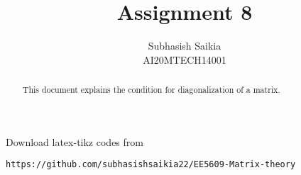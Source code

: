 \documentclass[journal,12pt]{IEEEtran}
\begin{document}
\onecolumn

\newtheorem{theorem}{Theorem}[section]
\newtheorem{problem}{Problem}
\newtheorem{proposition}{Proposition}[section]
\newtheorem{lemma}{Lemma}[section]
\newtheorem{corollary}[theorem]{Corollary}
\newtheorem{example}{Example}[section]
\newtheorem{definition}[problem]{Definition}

\newcommand{\BEQA}{\begin{eqnarray}}
\newcommand{\EEQA}{\end{eqnarray}}
\newcommand{\define}{\stackrel{\triangle}{=}}

\raggedbottom
\setlength{\parindent}{0pt}
\providecommand{\mbf}{\mathbf}
\providecommand{\pr}[1]{\ensuremath{\Pr\left(#1\right)}}
\providecommand{\qfunc}[1]{\ensuremath{Q\left(#1\right)}}
\providecommand{\sbrak}[1]{\ensuremath{{}\left[#1\right]}}
\providecommand{\lsbrak}[1]{\ensuremath{{}\left[#1\right.}}
\providecommand{\rsbrak}[1]{\ensuremath{{}\left.#1\right]}}
\providecommand{\brak}[1]{\ensuremath{\left(#1\right)}}
\providecommand{\lbrak}[1]{\ensuremath{\left(#1\right.}}
\providecommand{\rbrak}[1]{\ensuremath{\left.#1\right)}}
\providecommand{\cbrak}[1]{\ensuremath{\left\{#1\right\}}}
\providecommand{\lcbrak}[1]{\ensuremath{\left\{#1\right.}}
\providecommand{\rcbrak}[1]{\ensuremath{\left.#1\right\}}}
\theoremstyle{remark}
\newtheorem{rem}{Remark}
\newcommand{\sgn}{\mathop{\mathrm{sgn}}}
\providecommand{\system}{\overset{\mathcal{H}}{ \longleftrightarrow}}
\newcommand{\solution}{\noindent \textbf{Solution: }}
\newcommand{\cosec}{\,\text{cosec}\,}
\providecommand{\dec}[2]{\ensuremath{\overset{#1}{\underset{#2}{\gtrless}}}}
\newcommand{\myvec}[1]{\ensuremath{\begin{pmatrix}#1\end{pmatrix}}}
\newcommand{\mydet}[1]{\ensuremath{\begin{vmatrix}#1\end{vmatrix}}}
\makeatletter
{}
\makeatother
\let\StandardTheFigure\thefigure
\let\vec\mathbf
\renewcommand{\thefigure}{\theproblem}
\def\putbox#1#2#3{\makebox[0in][l]{\makebox[#1][l]{}\raisebox{\baselineskip}[0in][0in]{\raisebox{#2}[0in][0in]{#3}}}}
     \def\rightbox#1{\makebox[0in][r]{#1}}
     \def\centbox#1{\makebox[0in]{#1}}
     \def\topbox#1{\raisebox{-\baselineskip}[0in][0in]{#1}}
     \def\midbox#1{\raisebox{-0.5\baselineskip}[0in][0in]{#1}}
\vspace{3cm}
\title{Assignment 8}
\author{Subhasish Saikia\\AI20MTECH14001}
\maketitle
\begin{abstract}
This document explains the condition for diagonalization of a matrix.
\end{abstract}
\bigskip
\renewcommand{\thefigure}{\theenumi}
\renewcommand{\thetable}{\theenumi}
Download latex-tikz codes from
\begin{lstlisting}
https://github.com/subhasishsaikia22/EE5609-Matrix-theory
\end{lstlisting}
\end{document}
